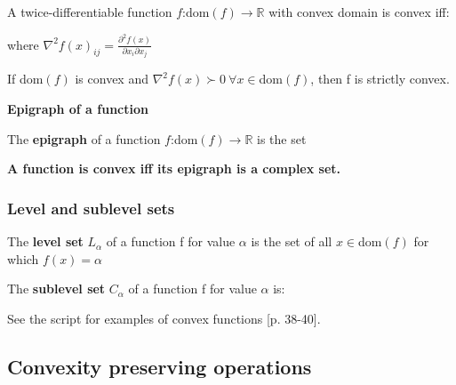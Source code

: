 \documentclass[8pt,a4paper]{scrartcl}
\begin{document}
\begin{multicols*}{3}
\finn

A twice-differentiable function $f$:dom$(f)\rightarrow\mathbb{R}$ with convex domain is convex iff:


where $\nabla^2f(x)_{ij}=\frac{\partial^2f(x)}{\partial x_i\partial x_j}$

\finn

If dom$(f)$ is convex and $\nabla^2 f(x)\succ 0\ \forall x\in$dom$(f)$, then f is strictly convex.

\textbf{Epigraph of a function}

The \textbf{epigraph} of a function $f$:dom$(f)\rightarrow\mathbb{R}$ is the set


\textbf{A function is convex iff its epigraph is a complex set.}


\subsubsection{Level and sublevel sets}

The \textbf{level set} $L_\alpha$ of a function f for value $\alpha$ is the set of all $x\in$dom$(f)$ for which $f(x)=\alpha$



\finn

The \textbf{sublevel set} $C_\alpha$ of a function f for value $\alpha$ is:



\finn

See the script for examples of convex functions [p. 38-40].

\subsection{Convexity preserving operations}


\end{multicols*}
\end{document}
